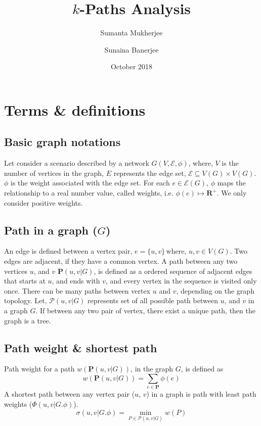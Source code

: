 \documentclass{article}
\title{$k$-Paths Analysis}
\author{{Sumanta Mukherjee} \and {Sunaina Banerjee}}
\date{October 2018}
\begin{document}
\maketitle

\section{Terms \& definitions}
\subsection{Basic graph notations}\label{sec:notation}
Let consider a scenario described  by a network $G(V,\mathcal{E},\phi)$, where, $V$ is the number of vertices in the graph, $E$ represents the edge set, $\mathcal{E} \subseteq V(G)\times V(G)$. $\phi$ is the weight associated with the edge set. For each $e \in \mathcal{E}(G)$, $\phi$ maps the relationship to a real number value, called weights, i.e. $\phi(e) \mapsto \mathbf{R}^{+}$. We only consider positive weights.

\subsection{Path in a graph ($G$)}\label{sec:path}
An edge is defined between a vertex pair, $e = \lbrace u, v \rbrace \,\text{where},\, u,v\in V(G)$. Two edges are adjacent, if they have a common vertex. A path between any two vertices $u$, and $v$ $\mathbf{P}(u,v \vert G)$, is defined as a ordered sequence of adjacent edges that starts at $u$, and ends with $v$, and every vertex in the sequence is visited only once. There can be many paths between vertex $u$ and $v$, depending on the graph topology. Let, $\mathcal{P}(u,v\vert G)$ represents set of all possible path between $u$, and $v$ in a graph $G$. If between any two pair of vertex, there exist a unique path, then the graph is a tree.

\subsection{Path weight \& shortest path}\label{sec:short}
Path weight for a path $w(\mathbf{P}(u,v\vert G))$, in the graph $G$, is defined as 
\begin{equation*}
     w(\mathbf{P}(u, v \vert G) ) = \sum_{e \in \mathbf{P}} \phi(e)
\end{equation*}
A shortest path between any vertex pair ($u$, $v$) in a graph is path with least path weights ($\Phi(u,v\vert G.\phi)$).
\begin{equation*}
    \sigma(u,v\vert G.\phi) = \min_{P \in \mathcal{P}(u,v\vert G)} w(P)
\end{equation*}
\end{document}
